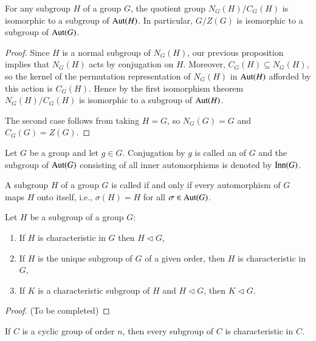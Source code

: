 \begin{corollary}
    For any subgroup $H$ of a group $G$, the quotient group $N_G(H)/C_G(H)$ is isomorphic to a subgroup of $\operatorname{Aut}(H)$. In particular, $G/Z(G)$ is isomorphic to a subgroup of $\operatorname{Aut}(G)$.
\end{corollary}
\begin{proof}
    Since $H$ is a normal subgroup of $N_G(H)$, our previous proposition implies that $N_G(H)$ acts by conjugation on $H$. Moreover, $C_G(H) \subseteq N_G(H)$, so the kernel of the permutation representation of $N_G(H)$ in $\operatorname{Aut}(H)$ afforded by this action is $C_G(H)$. Hence by the first isomorphism theorem $N_G(H)/C_G(H)$ is isomorphic to a subgroup of $\operatorname{Aut}(H)$.

    The second case follows from taking $H = G$, so $N_G(G) = G$ and $C_G(G) = Z(G)$.
\end{proof}


\begin{definition}
    Let $G$ be a group and let $g \in G$. Conjugation by $g$ is called an  of $G$ and the subgroup of $\operatorname{Aut}(G)$ consisting of all inner automorphisms is denoted by $\operatorname{Inn}(G)$.
\end{definition}


\begin{definition}
    A subgroup $H$ of a group $G$ is called  if and only if every automorphism of $G$ maps $H$ onto itself, i.e., $\sigma(H) = H$ for all $\sigma \in \operatorname{Aut}(G)$.
\end{definition}


\begin{proposition}
    Let $H$ be a subgroup of a group $G$: \begin{enumerate}
        \item If $H$ is characteristic in $G$ then $H \vartriangleleft G$,
        \item If $H$ is the unique subgroup of $G$ of a given order, then $H$ is characteristic in $G$,
        \item If $K$ is a characteristic subgroup of $H$ and $H \vartriangleleft G$, then $K\vartriangleleft G$.
    \end{enumerate}
\end{proposition}
\begin{proof}
    (To be completed)
\end{proof}


\begin{corollary}
    If $C$ is a cyclic group of order $n$, then every subgroup of $C$ is characteristic in $C$.
\end{corollary}


